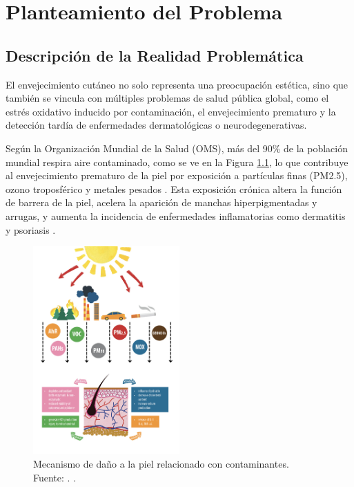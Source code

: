 \chapter{Planteamiento del Problema}
\section{Descripción de la Realidad Problemática}

El envejecimiento cutáneo no solo representa una preocupación estética, sino que también se vincula con múltiples problemas de salud pública global, como el estrés oxidativo inducido por contaminación, el envejecimiento prematuro y la detección tardía de enfermedades dermatológicas o neurodegenerativas.

Según la Organización Mundial de la Salud (OMS), más del 90\% de la población mundial respira aire contaminado, como se ve en la Figura \ref{1:figairp}, lo que contribuye al envejecimiento prematuro de la piel por exposición a partículas finas (PM2.5), ozono troposférico y metales pesados \parencite{Ruri2020}. Esta exposición crónica altera la función de barrera de la piel, acelera la aparición de manchas hiperpigmentadas y arrugas, y aumenta la incidencia de enfermedades inflamatorias como dermatitis y psoriasis \parencite{ding2020airpollution}.

\begin{figure}[H]
	\begin{center}
		\includegraphics[width=0.5\textwidth]{1/figures/airpollution.png}
		\caption[Mecanismo de daño a la piel relacionado con contaminantes]{Mecanismo de daño a la piel relacionado con contaminantes.\\
			Fuente: \cite{Ruri2020}. .}
		\label{1:figairp}
	\end{center}
\end{figure}


